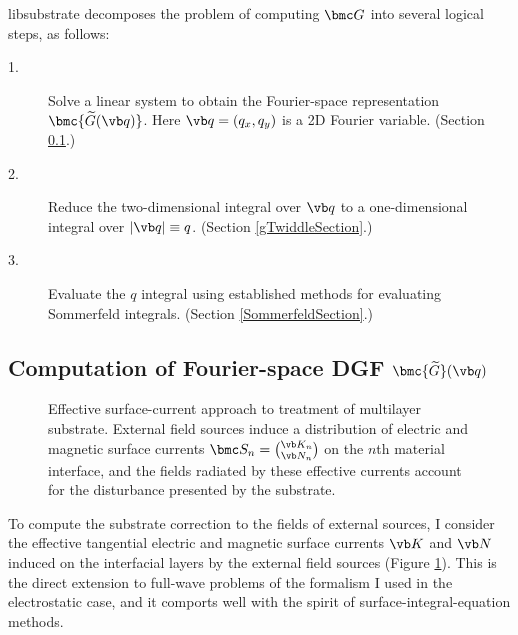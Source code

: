 \documentclass[letterpaper]{article}
\renewcommand{\wt}{\widetilde}
\begin{document}
{\sc libsubstrate} decomposes the problem of computing
$\bmc G$ into several logical steps, as follows:

\begin{description}
 \item[1.] Solve a linear system to obtain the Fourier-space
             representation $\bmc{\wt G(\vb q)}$. Here $\vb q=(q_x,q_y)$ is a
             2D Fourier variable. (Section \ref{GTwiddleSection}.)
 \item[2.] Reduce the two-dimensional integral over $\vb q$ to a
             one-dimensional integral over $|\vb q|\equiv q$.
             (Section \ref{gTwiddleSection}.)
 \item[3.] Evaluate the $q$ integral using established methods for
             evaluating Sommerfeld integrals.
             (Section \ref{SommerfeldSection}.)
\end{description}

\newpage
\subsection{Computation of Fourier-space DGF $\bmc{\wt G}(\vb q)$}
\label{GTwiddleSection}

\begin{figure}[t]
\begin{center}
\caption{Effective surface-current approach to treatment of
multilayer substrate. External field sources induce a distribution
of electric and magnetic surface currents $\bmc S_n={\vb K_n \choose \vb N_n}$
on the $n$th material interface, and the fields radiated by these
effective currents account for the disturbance presented by
the substrate.}
\label{SurfaceCurrentFigure}
\end{center}
\end{figure}
To compute the substrate correction to the fields of external sources,
I consider the effective tangential electric and magnetic
surface currents $\vb K$ and $\vb N$ induced on the interfacial 
layers by the external field sources 
(Figure \ref{SurfaceCurrentFigure}). This is the direct extension
to full-wave problems of the formalism I used in the electrostatic
case, and it comports well with the spirit of
surface-integral-equation methods.
\end{document}
